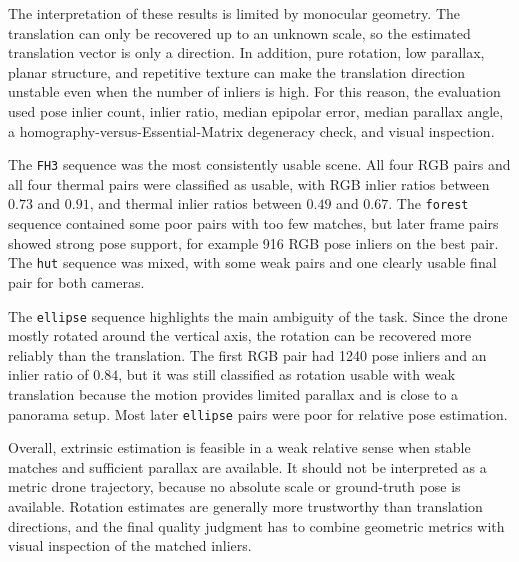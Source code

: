 The interpretation of these results is limited by monocular geometry. The
translation can only be recovered up to an unknown scale, so the estimated
translation vector is only a direction. In addition, pure rotation, low
parallax, planar structure, and repetitive texture can make the translation
direction unstable even when the number of inliers is high. For this reason,
the evaluation used pose inlier count, inlier ratio, median epipolar error,
median parallax angle, a homography-versus-Essential-Matrix degeneracy check,
and visual inspection.

The \texttt{FH3} sequence was the most consistently usable scene. All four RGB
pairs and all four thermal pairs were classified as usable, with RGB inlier
ratios between \(0.73\) and \(0.91\), and thermal inlier ratios between
\(0.49\) and \(0.67\). The \texttt{forest} sequence contained some poor pairs
with too few matches, but later frame pairs showed strong pose support, for
example 916 RGB pose inliers on the best pair. The \texttt{hut} sequence was
mixed, with some weak pairs and one clearly usable final pair for both cameras.

The \texttt{ellipse} sequence highlights the main ambiguity of the task. Since
the drone mostly rotated around the vertical axis, the rotation can be recovered
more reliably than the translation. The first RGB pair had 1240 pose inliers
and an inlier ratio of \(0.84\), but it was still classified as rotation usable
with weak translation because the motion provides limited parallax and is close
to a panorama setup. Most later \texttt{ellipse} pairs were poor for relative
pose estimation.

Overall, extrinsic estimation is feasible in a weak relative sense when stable
matches and sufficient parallax are available. It should not be interpreted as
a metric drone trajectory, because no absolute scale or ground-truth pose is
available. Rotation estimates are generally more trustworthy than translation
directions, and the final quality judgment has to combine geometric metrics
with visual inspection of the matched inliers.
